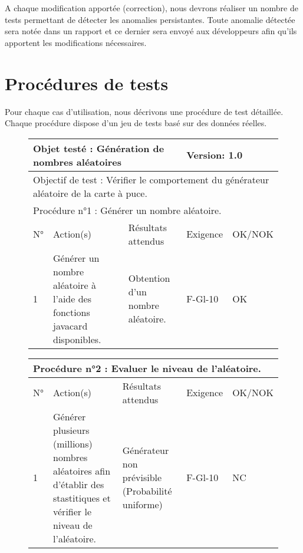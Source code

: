 \documentclass[a4paper,11pt,french]{article}
\begin{document}
A chaque modification apportée (correction), nous devrons réaliser un nombre
de tests permettant de détecter les anomalies persistantes. Toute anomalie
détectée sera notée dans un rapport et ce dernier sera envoyé aux
développeurs afin qu'ils apportent les modifications nécessaires.

\section{Procédures de tests}
Pour chaque cas d’utilisation, nous décrivons une procédure de test
détaillée. Chaque procédure dispose d'un jeu de tests basé sur des
données réelles.

\newpage

\begin{figure}[!h]
\begin{tabular}{|p{1cm}|p{5cm}|p{5cm}|p{2cm}|p{2cm}|}
\hline
\multicolumn{3}{|l|}{Objet testé : Génération de nombres aléatoires} & \multicolumn{2}{|l|}{Version: 1.0} \\
\hline
\multicolumn{5}{|l|}{Objectif de test : Vérifier le comportement du générateur aléatoire de la carte à puce.} \\
\hline
\multicolumn{5}{|l|}{Procédure n°1 : Générer un nombre aléatoire.} \\
\hline
N° & Action(s) & Résultats attendus & Exigence & OK/NOK \\
\hline
1 & Générer un nombre aléatoire à l'aide des fonctions javacard disponibles. & Obtention d'un nombre aléatoire. & F-Gl-10 & OK \\
\hline
\end{tabular}
\end{figure}


\begin{figure}[!h]
\begin{tabular}{|p{1cm}|p{5cm}|p{5cm}|p{2cm}|p{2cm}|}
\hline
\multicolumn{5}{|l|}{Procédure n°2 : Evaluer le niveau de l'aléatoire.} \\
\hline
N° & Action(s) & Résultats attendus & Exigence & OK/NOK \\
\hline
1 & Générer plusieurs (millions) nombres aléatoires afin d'établir des stastitiques et vérifier le niveau de l'aléatoire. &
Générateur non prévisible (Probabilité uniforme) & F-Gl-10 & NC \\
\hline
\end{tabular}
\end{figure}
\end{document}
